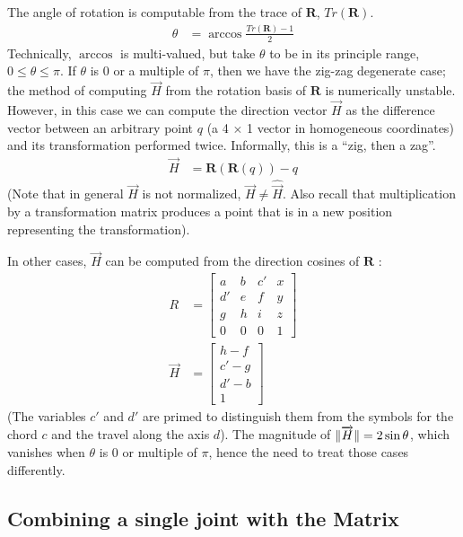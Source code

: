 \documentclass[mathematics,article,submit,pdftex,moreauthors]{Definitions/mdpi}
\DeclarePairedDelimiter{\norm}{\lVert}{\rVert}
\begin{document}
The angle of rotation is computable from the trace of $\bm{R}$, $Tr(\bm{R})$.
\begin{align}
  \theta &= \arccos{\frac{Tr(\bm{R}) - 1}{2}}
\end{align}
Technically, $\arccos$ is multi-valued, but take $\theta$
to be in its principle range, $0 \leq \theta \leq \pi$.
If $\theta$ is $0$ or a multiple of $\pi$, then we have the zig-zag
degenerate case; the method of computing $\overrightarrow{H}$ from the rotation
basis of $\bm{R}$ is numerically unstable.
However, in this case
we can compute the direction vector $\overrightarrow{H}$ as the difference vector
between an arbitrary point $q$ (a 4 $\times$ 1 vector in homogeneous coordinates)
and its transformation performed
twice. Informally, this is a ``zig, then a zag''.
\begin{align}
  \overrightarrow{H} &= \bm{R} ( \bm{R}( q)) - q
\end{align}
(Note that in general $\overrightarrow{H}$ is not normalized, $\overrightarrow{H} \neq \hat{\overrightarrow{H}}$.
Also recall that multiplication by a transformation matrix
produces a point that is in a new position representing
the transformation).

In other cases, $\overrightarrow{H}$ can be computed from the direction
cosines of $\bm{R}$ \cite{wiki:rotation}:
\begin{align}
  R &=     \begin{bmatrix} a & b & c' & x \\ d' & e & f & y\\ g & h & i & z\\ 0 &  0 & 0 & 1\end{bmatrix} \\
    \overrightarrow{H} &=  \begin{bmatrix} h - f \\ c' - g \\ d' - b \\ 1 \end{bmatrix}
\end{align}
(The variables $c'$ and $d'$ are primed to distinguish them from
the symbols for the chord $c$ and the travel along the axis $d$).
The magnitude of $\norm{\overrightarrow{H}} = 2 \sin{\theta}$, which vanishes
when $\theta$ is $0$ or multiple of $\pi$, hence the need
to treat those cases differently.

\subsection{Combining a single joint with the Matrix}
\end{document}

